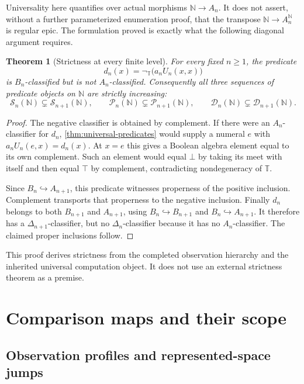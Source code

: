 \documentclass[11pt,a4paper]{article}
\numberwithin{equation}{section}
\newtheorem{theorem}{Theorem}[section]
\theoremstyle{definition}
\theoremstyle{remark}
\theoremstyle{plain}
\newcommand{\N}{\mathbb N}
\newcommand{\TV}{\mathbb T}
\newcommand{\incl}{\hookrightarrow}
\newcommand{\SSn}{\mathcal S}
\newcommand{\PPn}{\mathcal P}
\newcommand{\DDn}{\mathcal D}
\newcommand{\negT}{\neg_{\TV}}
\begin{document}
Universality here quantifies over actual morphisms $\N\to A_n$.
It does not assert, without a further parameterized enumeration proof,
that the transpose $\N\to A_n^{\N}$ is regular epic. The formulation
proved is exactly what the following diagonal argument requires.

\begin{theorem}[Strictness at every finite level]
\label{thm:finite-strictness}
For every fixed $n\geq1$, the predicate
\begin{equation}\label{eq:descriptive-diagonal}
 d_n(x)=\negT\bigl(a_nU_n(x,x)\bigr)
\end{equation}
is $B_n$-classified but is not $A_n$-classified. Consequently all
three sequences of predicate objects on $\N$ are strictly increasing:
\[
 \SSn_n(\N)\subsetneq\SSn_{n+1}(\N),\qquad
 \PPn_n(\N)\subsetneq\PPn_{n+1}(\N),\qquad
 \DDn_n(\N)\subsetneq\DDn_{n+1}(\N).
\]
\end{theorem}
\begin{proof}
The negative classifier is obtained by complement. If there were an
$A_n$-classifier for $d_n$, \cref{thm:universal-predicates} would
supply a numeral $e$ with
$a_nU_n(e,x)=d_n(x)$. At $x=e$ this gives a Boolean algebra element
equal to its own complement. Such an element would equal $\bot$ by
taking its meet with itself and then equal $\top$ by complement,
contradicting nondegeneracy of $\TV$.

Since $B_n\incl A_{n+1}$, this predicate witnesses properness of
the positive inclusion. Complement transports that properness to
the negative inclusion. Finally $d_n$ belongs to both $B_{n+1}$ and
$A_{n+1}$, using $B_n\incl B_{n+1}$ and $B_n\incl A_{n+1}$.
It therefore has a $\Delta_{n+1}$-classifier, but no
$\Delta_n$-classifier because it has no $A_n$-classifier.
The claimed proper inclusions follow.
\end{proof}

This proof derives strictness from the completed observation hierarchy
and the inherited universal computation object. It does not use an
external strictness theorem as a premise.

\section{Comparison maps and their scope}
\label{sec:comparison}

\subsection{Observation profiles and represented-space jumps}
\end{document}
